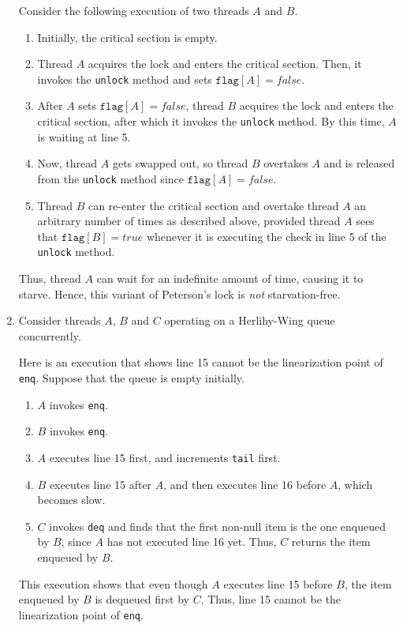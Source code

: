 \documentclass[conference,compsoc]{IEEEtran}
\begin{document}
\begin{enumerate}
    Consider the following execution of two threads \(A\) and \(B\).
    \begin{enumerate}
        \item Initially, the critical section is empty.
        \item Thread \(A\) acquires the lock and enters the critical section.
        Then, it invokes the \texttt{unlock} method and sets \(\texttt{flag}[A]
        = false\).
        \item After \(A\) sets \(\texttt{flag}[A] = false\), thread \(B\)
        acquires the lock and enters the critical section, after which it
        invokes the \texttt{unlock} method. By this time, \(A\) is waiting at
        line 5.
        \item Now, thread \(A\) gets swapped out, so thread \(B\) overtakes
        \(A\) and is released from the \texttt{unlock} method since
        \(\texttt{flag}[A] = false\).
        \item Thread \(B\) can re-enter the critical section and overtake thread
        \(A\) an arbitrary number of times as described above, provided thread
        \(A\) sees that \(\texttt{flag}[B] = true\) whenever it is executing the
        check in line 5 of the \texttt{unlock} method.
    \end{enumerate}
    Thus, thread \(A\) can wait for an indefinite amount of time, causing it to
    starve. Hence, this variant of Peterson's lock is \emph{not}
    starvation-free.

    \item Consider threads \(A\), \(B\) and \(C\) operating on a Herlihy-Wing
    queue concurrently.
    
    Here is an execution that shows line 15 cannot be the linearization point of
    \texttt{enq}. Suppose that the queue is empty initially.
    \begin{enumerate}
        \item \(A\) invokes \texttt{enq}.
        \item \(B\) invokes \texttt{enq}.
        \item \(A\) executes line 15 first, and increments \texttt{tail} first.
        \item \(B\) executes line 15 after \(A\), and then executes line 16
        before \(A\), which becomes slow.
        \item \(C\) invokes \texttt{deq} and finds that the first non-null item
        is the one enqueued by \(B\), since \(A\) has not executed line 16 yet.
        Thus, \(C\) returns the item enqueued by \(B\).
    \end{enumerate}
    This execution shows that even though \(A\) executes line 15 before \(B\),
    the item enqueued by \(B\) is dequeued first by \(C\). Thus, line 15 cannot
    be the linearization point of \texttt{enq}.


\end{enumerate}
\end{document}
